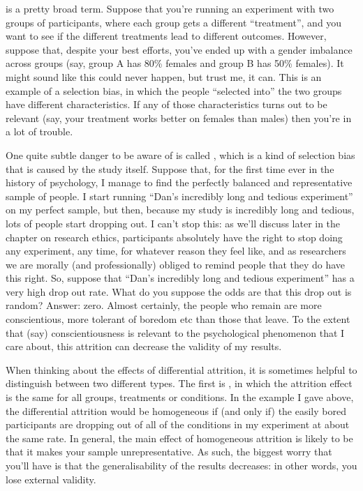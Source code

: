 
 is a pretty broad term. Suppose that you're running an experiment with two groups of participants, where each group gets a different ``treatment'', and you want to see if the different treatments lead to different outcomes. However, suppose that, despite your best efforts, you've ended up with a gender imbalance across groups (say, group A has 80\% females and group B has 50\% females). It might sound like this could never happen, but trust me, it can. This is an example of a selection bias, in which the people ``selected into'' the two groups have different characteristics. If any of those characteristics turns out to be relevant (say, your treatment works better on females than males) then you're in a lot of trouble. 


One quite subtle danger to be aware of is called , which is a kind of selection bias that is caused by the study itself. Suppose that, for the first time ever in the history of psychology, I manage to find the perfectly balanced and representative sample of people. I start running ``Dan's incredibly long and tedious experiment'' on my perfect sample, but then, because my study is incredibly long and tedious, lots of people start dropping out. I can't stop this: as we'll discuss later in the chapter on research ethics, participants absolutely have the right to stop doing any experiment, any time, for whatever reason they feel like, and as researchers we are morally (and professionally) obliged to remind people that they do have this right. So, suppose that ``Dan's incredibly long and tedious experiment'' has a very high drop out rate. What do you suppose the odds are that this drop out is random? Answer: zero. Almost certainly, the people who remain are more conscientious, more tolerant of boredom etc than those that leave. To the extent that (say) conscientiousness is relevant to the psychological phenomenon that I care about, this attrition can decrease the validity of my results.

When thinking about the effects of differential attrition, it is sometimes helpful to distinguish between two different types. The first is , in which the attrition effect is the same for all groups, treatments or conditions. In the example I gave above, the differential attrition would be homogeneous if (and only if) the easily bored participants are dropping out of all of the conditions in my experiment at about the same rate. In general, the main effect of homogeneous attrition is likely to be that it makes your sample unrepresentative. As such, the biggest worry that you'll have is that the generalisability of the results decreases: in other words, you lose external validity.

